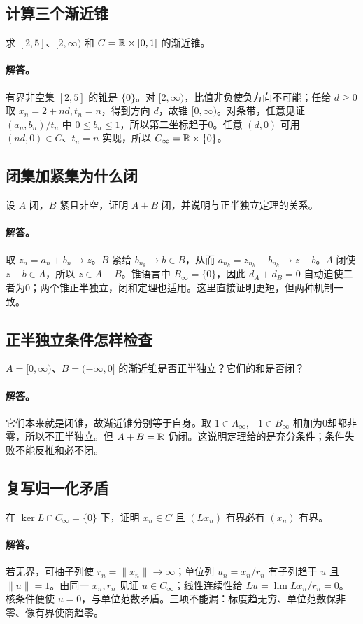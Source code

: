 \subsection{计算三个渐近锥}
求 $[2,5]$、$[2,\infty)$ 和 $C=\mathbb{R}\times[0,1]$ 的渐近锥。
\paragraph{解答。}有界非空集 $[2,5]$ 的锥是 $\{0\}$。对 $[2,\infty)$，比值非负使负方向不可能；任给 $d\ge0$ 取 $x_n=2+nd,t_n=n$，得到方向 $d$，故锥 $[0,\infty)$。对条带，任意见证 $(a_n,b_n)/t_n$ 中 $0\le b_n\le1$，所以第二坐标趋于0。任意 $(d,0)$ 可用 $(nd,0)\in C$、$t_n=n$ 实现，所以 $C_\infty=\mathbb{R}\times\{0\}$。
\subsection{闭集加紧集为什么闭}
设 $A$ 闭，$B$ 紧且非空，证明 $A+B$ 闭，并说明与正半独立定理的关系。
\paragraph{解答。}取 $z_n=a_n+b_n\to z$。$B$ 紧给 $b_{n_k}\to b\in B$，从而 $a_{n_k}=z_{n_k}-b_{n_k}\to z-b$。$A$ 闭使 $z-b\in A$，所以 $z\in A+B$。锥语言中 $B_\infty=\{0\}$，因此 $d_A+d_B=0$ 自动迫使二者为0；两个锥正半独立，闭和定理也适用。这里直接证明更短，但两种机制一致。
\subsection{正半独立条件怎样检查}
$A=[0,\infty)$、$B=(-\infty,0]$ 的渐近锥是否正半独立？它们的和是否闭？
\paragraph{解答。}它们本来就是闭锥，故渐近锥分别等于自身。取 $1\in A_\infty,-1\in B_\infty$ 相加为0却都非零，所以不正半独立。但 $A+B=\mathbb{R}$ 仍闭。这说明定理给的是充分条件；条件失败不能反推和必不闭。
\subsection{复写归一化矛盾}
在 $\ker L\cap C_\infty=\{0\}$ 下，证明 $x_n\in C$ 且 $(Lx_n)$ 有界必有 $(x_n)$ 有界。
\paragraph{解答。}若无界，可抽子列使 $r_n=\|x_n\|\to\infty$；单位列 $u_n=x_n/r_n$ 有子列趋于 $u$ 且 $\|u\|=1$。由同一 $x_n,r_n$ 见证 $u\in C_\infty$；线性连续性给 $Lu=\lim Lx_n/r_n=0$。核条件便使 $u=0$，与单位范数矛盾。三项不能漏：标度趋无穷、单位范数保非零、像有界使商趋零。
